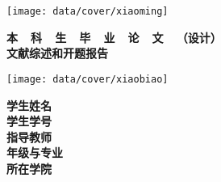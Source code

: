 \thispagestyle{empty}

{
\setlength{\parindent}{0em}
\renewcommand{\baselinestretch}{2}

\vspace*{-7mm}

\begin{center}
  \texttt{[image: data/cover/xiaoming]}
\end{center}

\vspace{-1mm}

{
\renewcommand{\baselinestretch}{1.8}
\heiti\xiaoyi\bfseries
\centering
本~~科~~生~~毕~~业~~论~~文~~（设计） \\
文献综述和开题报告 \par
}

\vspace{4em}

\begin{center}
  \texttt{[image: data/cover/xiaobiao]}
\end{center}

\vspace{3em}

{
\renewcommand{\baselinestretch}{1.65}
\stfangsong\sanhao\bfseries
\centering
学生姓名 \;\;\; \underline{\makebox[12em]{\zjuauthornamec}} \vspace{1em}  \\
学生学号 \;\;\; \underline{\makebox[12em]{\zjuauthorid}} \vspace{1em} \\
指导教师 \;\;\;\;\;\; \underline{\makebox[12em]{\zjumentorc}} \vspace{1em}  \\
年级与专业 \;\;\; \underline{\makebox[12em]{\zjugrade~~\zjumajor}} \vspace{1em}  \\
所在学院 \;\;\;\;\;\; \underline{\makebox[12em]{\zjucollegec}} \par
}
}

